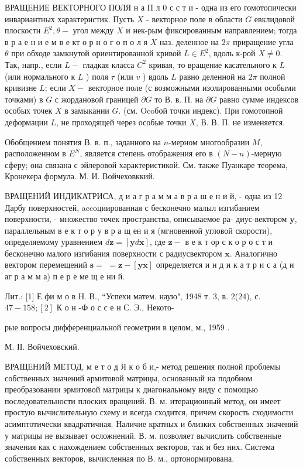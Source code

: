 \documentclass[10pt]{article}
\begin{document}
ВРАЩЕНИЕ ВЕКТОРНОГО ПОЛЯ н а П л 0 с с т и - одна из его гомотопически инвариантных характеристик. Пусть $X$ - векторное поле в области $G$ евклидовой плоскости $E^{2}, \theta-$ угол между $X$ и нек-рым фиксированным направлением; тогда в р а е н и е м в е кт о р н о г о п о л я $X$ наз. деленное на $2 \pi$ приращение угла $\theta$ при обходе замкнутой ориентированной кривой $L \in E^{2}$, вдоль к-рой $X \neq 0$. Так, напр., если $L-$ гладкая класса $C^{2}$ кривая, то вращение касательного к $L$ (или нормального к $L$ ) поля $\tau$ (или $v$ ) вдоль $L$ равно деленной на $2 \pi$ полной кривизне $L$; если $X-$ векторное поле (с возможными изолированными особыми точками) в $G$ с жордановой границей $\partial G$ то В. в. П. на $\partial G$ равно сумме индексов особых точек $X$ в замыкании $G$. (см. Ocoбой точки индекс). При гомотопной деформации $L$, не проходящей через особые точки $X$, В. В. П. не изменяется.



Обобщением понятия В. в. п., заданного на $n$-мерном многообразии $M$, расположенном в $E^{N}$, является степень отображения его в $(N-n)$-мерную сферу; она связана с эйлеровой характеристикой. См. также Пуанкаре теорема, Кронекера формула. М. И. Войчеховккий.



ВРАЩЕНИЙ ИНДИКАТРИСА, д и а г р а м м а в р а ш е н и й, - одна из 12 Дарбу поверхностей, accoциированная с бесконечно малыл изгибанием поверхности, - множество точек пространства, описываемое ра- диус-вектором $\boldsymbol{y}$, параллельным в е к т о р у в р а щ ен и я (мгновенной угловой скорости), определяемому уравнением $d \boldsymbol{z}=[\boldsymbol{y} d \boldsymbol{x}]$, где $\boldsymbol{z}-$ в е к т ор с к о р о с т и бесконечно малого изгибания поверхности с радиусвектором $\boldsymbol{x}$. Аналогично вектором перемещений $\boldsymbol{s}=$ $=\boldsymbol{z}-[\boldsymbol{y} \boldsymbol{x}]$ определяется и н д и к а т р и с а (д и аг р а м м а) п е р е ме щ е ни й.



Лит.: [1] Е фи м о в Н. В., “Успехи матем. наую", 1948 т. 3, в. 2(24), с. $47-158 ;[2]$ К о н -Ф о с с е н С. Э., Некото-

рые вопросы дифференциальной геометрии в целом, м., 1959 .



М. ІІ. Войчеховский.



ВРАЩЕНИЙ МЕТОД, м е т о д Я к о б и,- метод решения полной проблемы собственных значений әрмитовой матрицы, основанный на подобном преобразовании эрмитовой матрицы к диагональному виду с помощью последовательности плоских вращений. В. м. итерационный метод, он имеет простую вычислительную схему и всегда сходится, причем скорость сходимости асимптотически квадратичная. Наличие кратных и близких собственных значений у матрицы не вызывает осложнений. В. м. позволяет вычислить собственные значения как с нахождением собственных векторов, так и без них. Система собственных векторов, вычисленная по В. м., ортонормирована.
\end{document}
